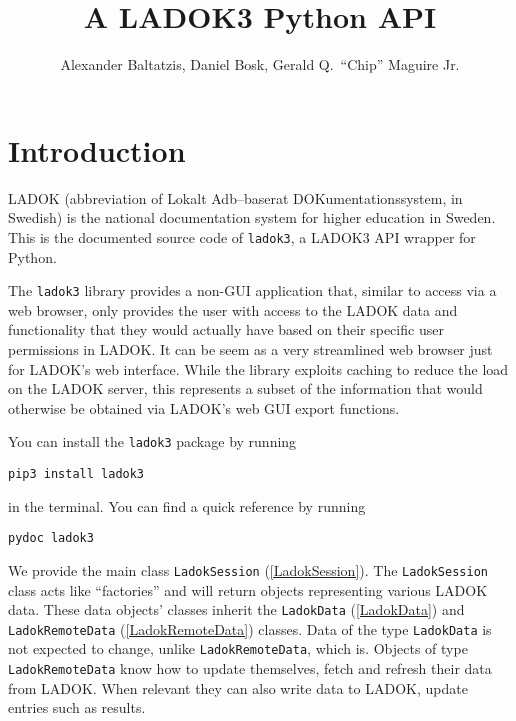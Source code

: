 \documentclass[a4paper,oneside]{book}
\title{%
  A LADOK3 Python API
}
\author{%
  Alexander Baltatzis,
  Daniel Bosk,
  Gerald Q.\ \enquote{Chip} Maguire Jr.
}
\affil{%
  KTH EECS\\
  \texttt{\{alba,dbosk,maguire\}@kth.se}
}
\newenvironment{abstract}{}{}
\begin{document}
\frontmatter
\maketitle

\vspace*{\fill}
\clearpage

\begin{abstract}
  
\end{abstract}
\clearpage

\tableofcontents
\clearpage

\mainmatter
\chapter{Introduction}

LADOK (abbreviation of \foreignlanguage{swedish}{Lokalt Adb–baserat 
DOKumentationssystem}, in Swedish) is the national documentation system for 
higher education in Sweden.
This is the documented source code of \texttt{ladok3}, a LADOK3 API wrapper for 
Python.

The \texttt{ladok3} library provides a non-GUI application that, similar to 
access via a web browser, only provides the user with access to the LADOK data 
and functionality that they would actually have based on their specific user 
permissions in LADOK.
It can be seem as a very streamlined web browser just for LADOK's web 
interface.
While the library exploits caching to reduce the load on the LADOK server, this 
represents a subset of the information that would otherwise be obtained via
LADOK's web GUI export functions.

You can install the \texttt{ladok3} package by running
\begin{verbatim}
pip3 install ladok3
\end{verbatim}
in the terminal.
You can find a quick reference by running
\begin{verbatim}
pydoc ladok3
\end{verbatim}

We provide the main class \texttt{LadokSession} (\cref{LadokSession}).
The \texttt{LadokSession} class acts like \enquote{factories} and will return 
objects representing various LADOK data.
These data objects' classes inherit the \texttt{LadokData} (\cref{LadokData}) 
and \texttt{LadokRemoteData} (\cref{LadokRemoteData}) classes.
Data of the type \texttt{LadokData} is not expected to change, unlike 
\texttt{LadokRemoteData}, which is.
Objects of type \texttt{LadokRemoteData} know how to update themselves, \ie fetch 
and refresh their data from LADOK.
When relevant they can also write data to LADOK, \ie update entries such as 
results.
\end{document}

